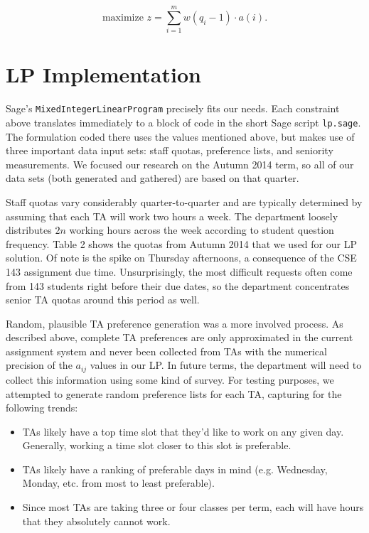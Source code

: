 \documentclass{article}
\begin{document}
\begin{multicols}{2}
\begin{equation}
\textrm{maximize } z = \sum_{i=1}^mw(q_i - 1)\cdot a(i).
\end{equation}

\section*{LP Implementation}

Sage's \texttt{MixedIntegerLinearProgram} precisely fits our needs. Each constraint above translates immediately to a block of code in the short Sage script \texttt{lp.sage}. The formulation coded there uses the values mentioned above, but makes use of three important data input sets: staff quotas, preference lists, and seniority measurements. We focused our research on the Autumn 2014 term, so all of our data sets (both generated and gathered) are based on that quarter.

Staff quotas vary considerably quarter-to-quarter and are typically determined by assuming that each TA will work two hours a week. The department loosely distributes $2n$ working hours across the week according to student question frequency. Table 2 shows the quotas from Autumn 2014 that we used for our LP solution. Of note is the spike on Thursday afternoons, a consequence of the CSE 143 assignment due time. Unsurprisingly, the most difficult requests often come from 143 students right before their due dates, so the department concentrates senior TA quotas around this period as well.

Random, plausible TA preference generation was a more involved process. As described above, complete TA preferences are only approximated in the current assignment system and never been collected from TAs with the numerical precision of the $a_{ij}$ values in our LP. In future terms, the department will need to collect this information using some kind of survey. For testing purposes, we attempted to generate random preference lists for each TA, capturing for the following trends:
\begin{itemize}
   \item TAs likely have a top time slot that they'd like to work on any given day. Generally, working a time slot closer to this slot is preferable.
   \item TAs likely have a ranking of preferable days in mind (e.g. Wednesday, Monday, etc. from most to least preferable).
   \item Since most TAs are taking three or four classes per term, each will have hours that they absolutely cannot work.
\end{itemize}


\end{multicols}
\end{document}
